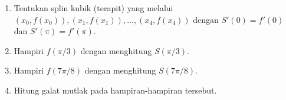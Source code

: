 \begin{enumerate}
\begin{enumerate}
\item Tentukan splin kubik (terapit) yang melalui $(x_{0},f(x_{0})),(x_{1},f(x_{1})),\ldots,(x_{4},f(x_{4}))$
dengan $S'(0)=f'(0)$ dan $S'(\pi)=f'(\pi)$.
\item Hampiri $f(\pi/3)$ dengan menghitung $S(\pi/3)$.
\item Hampiri $f(7\pi/8)$ dengan menghitung $S(7\pi/8)$.
\item Hitung galat mutlak pada hampiran-hampiran tersebut.
\end{enumerate}
\end{enumerate}
\noindent\finishexercises 
